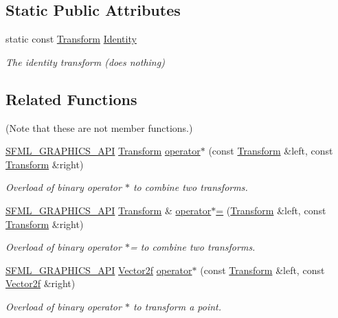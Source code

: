 \subsection*{Static Public Attributes}
\begin{DoxyCompactItemize}
\item 
static const \hyperlink{classsf_1_1_transform}{Transform} \hyperlink{classsf_1_1_transform_aa4eb1eecbcb9979d76e2543b337fdb13}{Identity}
\begin{DoxyCompactList}\small\item\em The identity transform (does nothing) \end{DoxyCompactList}\end{DoxyCompactItemize}
\subsection*{Related Functions}
(Note that these are not member functions.) \begin{DoxyCompactItemize}
\item 
\hyperlink{_graphics_2_export_8hpp_ab84c9f1035e146917de3bc0f98d72b35}{S\-F\-M\-L\-\_\-\-G\-R\-A\-P\-H\-I\-C\-S\-\_\-\-A\-P\-I} \hyperlink{classsf_1_1_transform}{Transform} \hyperlink{classsf_1_1_transform_a423ade8d6aa1378c695f8eb4bfce8981}{operator$\ast$} (const \hyperlink{classsf_1_1_transform}{Transform} \&left, const \hyperlink{classsf_1_1_transform}{Transform} \&right)
\begin{DoxyCompactList}\small\item\em Overload of binary operator $\ast$ to combine two transforms. \end{DoxyCompactList}\item 
\hyperlink{_graphics_2_export_8hpp_ab84c9f1035e146917de3bc0f98d72b35}{S\-F\-M\-L\-\_\-\-G\-R\-A\-P\-H\-I\-C\-S\-\_\-\-A\-P\-I} \hyperlink{classsf_1_1_transform}{Transform} \& \hyperlink{classsf_1_1_transform_a45a9de70a463117f851f1264a6f558ba}{operator$\ast$=} (\hyperlink{classsf_1_1_transform}{Transform} \&left, const \hyperlink{classsf_1_1_transform}{Transform} \&right)
\begin{DoxyCompactList}\small\item\em Overload of binary operator $\ast$= to combine two transforms. \end{DoxyCompactList}\item 
\hyperlink{_graphics_2_export_8hpp_ab84c9f1035e146917de3bc0f98d72b35}{S\-F\-M\-L\-\_\-\-G\-R\-A\-P\-H\-I\-C\-S\-\_\-\-A\-P\-I} \hyperlink{namespacesf_acf03098c2577b869e2fa6836cc48f1a0}{Vector2f} \hyperlink{classsf_1_1_transform_ac729169ec3036f3f3f3024c98efd041d}{operator$\ast$} (const \hyperlink{classsf_1_1_transform}{Transform} \&left, const \hyperlink{namespacesf_acf03098c2577b869e2fa6836cc48f1a0}{Vector2f} \&right)
\begin{DoxyCompactList}\small\item\em Overload of binary operator $\ast$ to transform a point. \end{DoxyCompactList}\end{DoxyCompactItemize}


